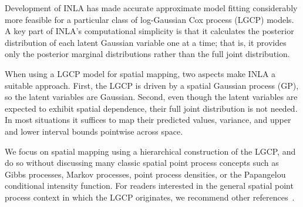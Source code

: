 \documentclass[]{interact}
\begin{document}

Development of INLA has made accurate approximate model fitting considerably
more feasible for a particular class of log-Gaussian Cox process (LGCP)
models. A key part of INLA's computational simplicity is that it calculates
the posterior distribution of each latent Gaussian variable one at a time;
that is, it provides only the posterior marginal distributions rather than the
full joint distribution.

When using a LGCP model for spatial mapping, two aspects make INLA a suitable
approach. First, the LGCP is driven by a spatial Gaussian process (GP), so the
latent variables are Gaussian. Second, even though the latent variables are
expected to exhibit spatial dependence, their full joint distribution is not
needed. In most situations it suffices to map their predicted values, variance,
and upper and lower interval bounds pointwise across space.

We focus on spatial mapping using a hierarchical construction of the LGCP, and
do so without discussing many classic spatial point process concepts such as
Gibbs processes, Markov processes, point process densities, or the Papangelou
conditional intensity function. For readers interested in the general spatial
point process context in which the LGCP originates, we recommend other
references~\cite{moellerwaagepetersen, digglepoint, cressie}.

\end{document}
